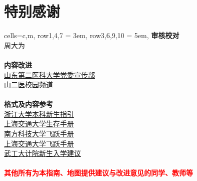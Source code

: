 \chapter*{特别感谢}
\noindent\begin{table*}[h]
    \centering
    \begin{tblr}{
        cells={c,m},
        row{1,4,7} = {3em},
        row{3,6,9,10} = {5em},}
        {\large\textbf{审核校对}}                                                       \\
        {周大为}                                                                       \\
        \\
        {\large\textbf{内容改进}}                                                       \\
        {\uline{\href{https://xchb.sdsmu.edu.cn/}{山东第二医科大学党委宣传部}}                   \\
        山二医校园频道}                                                                    \\
        \\
        {\large\textbf{格式及内容参考}}                                                    \\

        {\uline{\href{https://zjuers.com/welcome/}{浙江大学本科新生指引}}                     \\
        \uline{\href{https://survivesjtu.gitbook.io/survivesjtumanual}{上海交通大学生存手册}} \\
        \uline{\href{https://sustech-application.com/}{南方科技大学飞跃手册}}                 \\
        \uline{\href{https://survivesjtu.github.io/SJTU-Application/}{上海交通大学飞跃手册}}  \\
        \uline{\href{https://gitee.com/hanyaner/witjij}{武工大计院新生入学建议}}}              \\
        \\
        {\large\textbf{\textcolor{red}{其他所有为本指南、地图提供建议与改进意见的同学、教师等}}}
    \end{tblr}

\end{table*}